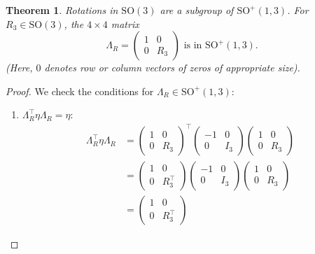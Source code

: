 \documentclass{amsart}
\newtheorem{theorem}{Theorem}[section]
\theoremstyle{definition}
\theoremstyle{remark}
\begin{document}
\begin{theorem}\label{thm:so3_rotations_in_so13}
  Rotations in $\mathrm{SO}(3)$ are a subgroup of $\mathrm{SO}^+(1,3)$. For $R_3\in\mathrm{SO}(3)$, the $4 \times 4$ matrix
  \begin{equation*}
    \Lambda_R =
    \begin{pmatrix}
      1 & 0 \\
      0 & R_3
    \end{pmatrix} \text{ is in } \mathrm{SO}^+(1,3).
  \end{equation*}
  (Here, $0$ denotes row or column vectors of zeros of appropriate size).
\end{theorem}
\begin{proof}
  We check the conditions for $\Lambda_R \in \mathrm{SO}^+(1,3)$:
  \begin{enumerate}
      \item $\Lambda_R^\top \eta \Lambda_R = \eta$:
        \begin{align*}
          \Lambda_R^\top\eta \Lambda_R &=
          \begin{pmatrix}
            1 & 0 \\
            0 & R_3
          \end{pmatrix}^\top
          \begin{pmatrix}
            -1 & 0 \\
            0 & I_3
          \end{pmatrix}
          \begin{pmatrix}
            1 & 0 \\
            0 & R_3
          \end{pmatrix} \\
          &=
          \begin{pmatrix}
            1 & 0 \\
            0 & R_3^\top
          \end{pmatrix}
          \begin{pmatrix}
            -1 & 0 \\
            0 & I_3
          \end{pmatrix}
          \begin{pmatrix}
            1 & 0 \\
            0 & R_3
          \end{pmatrix} \\
          &=
          \begin{pmatrix}
            1 & 0 \\
            0 & R_3^\top

\end{pmatrix}
\end{align*}
\end{enumerate}
\end{proof}
\end{document}
